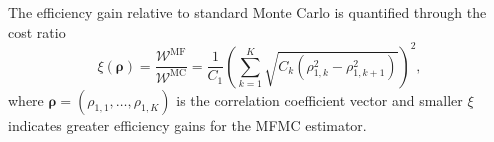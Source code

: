 

The efficiency gain relative to standard Monte Carlo is quantified through the cost ratio
%
\begin{equation}\label{eq:MFMC_sampling_cost_efficiency}
    \xi(\boldsymbol{\rho}) = \frac{\mathcal{W}^\text{MF}}{\mathcal{W}^\text{MC}} = \frac{1}{C_1} \left(\sum_{k=1}^K\sqrt{C_k\left(\rho_{1,k}^2 - \rho_{1,k+1}^2\right)}\right)^2,
\end{equation}
%
where $\boldsymbol{\rho} = (\rho_{1,1},\ldots, \rho_{1,K})$ is the correlation coefficient vector and smaller $\xi$ indicates greater efficiency gains for the MFMC estimator.




